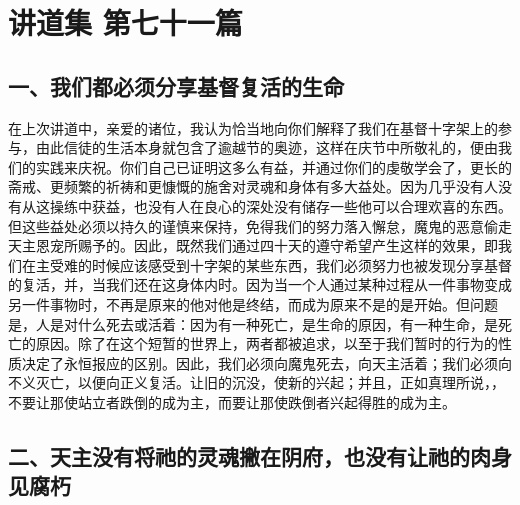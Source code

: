 

\section{讲道集 第七十一篇}

\par


\subsection{一、我们都必须分享基督复活的生命}

在上次讲道中，亲爱的诸位，我认为恰当地向你们解释了我们在基督十字架上的参与，由此信徒的生活本身就包含了逾越节的奥迹，这样在庆节中所敬礼的，便由我们的实践来庆祝。你们自己已证明这多么有益，并通过你们的虔敬学会了，更长的斋戒、更频繁的祈祷和更慷慨的施舍对灵魂和身体有多大益处。因为几乎没有人没有从这操练中获益，也没有人在良心的深处没有储存一些他可以合理欢喜的东西。但这些益处必须以持久的谨慎来保持，免得我们的努力落入懈怠，魔鬼的恶意偷走天主恩宠所赐予的。因此，既然我们通过四十天的遵守希望产生这样的效果，即我们在主受难的时候应该感受到十字架的某些东西，我们必须努力也被发现分享基督的复活，并，当我们还在这身体内时。因为当一个人通过某种过程从一件事物变成另一件事物时，不再是原来的他对他是终结，而成为原来不是的是开始。但问题是，人是对什么死去或活着：因为有一种死亡，是生命的原因，有一种生命，是死亡的原因。除了在这个短暂的世界上，两者都被追求，以至于我们暂时的行为的性质决定了永恒报应的区别。因此，我们必须向魔鬼死去，向天主活着；我们必须向不义灭亡，以便向正义复活。让旧的沉没，使新的兴起；并且，正如真理所说，，不要让那使站立者跌倒的成为主，而要让那使跌倒者兴起得胜的成为主。\par


\subsection{二、天主没有将祂的灵魂撇在阴府，也没有让祂的肉身见腐朽}

